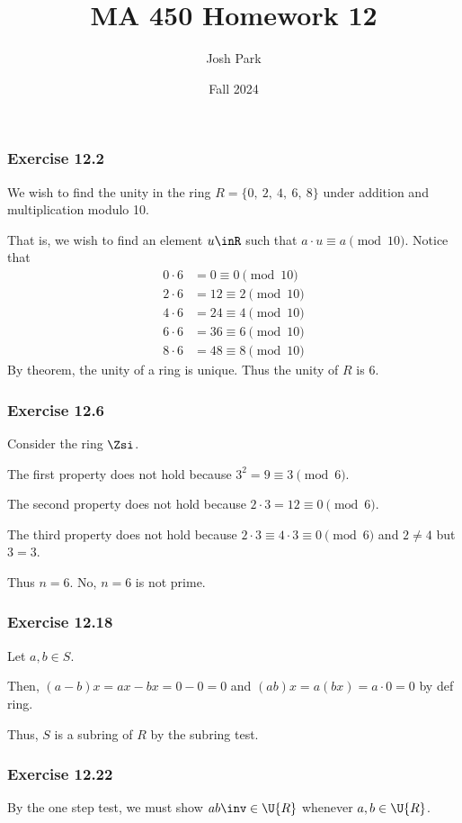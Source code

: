 \documentclass{article}
\author{Josh Park}
\date{\vspace*{-1em}Fall 2024}
\title{\vspace*{-2em}MA 450 Homework 12\vspace*{-1em}}
\begin{document}
\maketitle
\subsubsection*{Exercise 12.2}
We wish to find the unity in the ring \( R = \{0,\ 2,\ 4,\ 6,\ 8\} \) under addition and multiplication modulo 10.

That is, we wish to find an element \( u\inR \) such that \( a\cdot u \equiv a \pmod{10}\). Notice that
\begin{align*}
  0\cdot 6 &= 0 \equiv 0 \pmod{10} \\
  2\cdot 6 &= 12 \equiv 2 \pmod{10} \\
  4\cdot 6 &= 24 \equiv 4 \pmod{10} \\
  6\cdot 6 &= 36 \equiv 6 \pmod{10} \\
  8\cdot 6 &= 48 \equiv 8 \pmod{10}
\end{align*}
By theorem, the unity of a ring is unique. Thus the unity of \( R \) is \( 6 \).

\subsubsection*{Exercise 12.6}
Consider the ring \( \Zsi \).

The first property does not hold because \( 3^2 = 9 \equiv 3 \pmod{6} \).

The second property does not hold because \( 2\cdot 3 = 12 \equiv 0 \pmod{6} \).

The third property does not hold because \( 2\cdot 3 \equiv 4\cdot 3\equiv 0 \pmod{6} \) and \( 2\neq 4 \) but \( 3=3 \).

Thus \( n = 6 \). No, \( n = 6 \) is not prime.

\subsubsection*{Exercise 12.18}
Let \( a,b \in S \).

Then, \( (a-b)x = ax-bx = 0-0 = 0\) and \( (ab)x = a(bx) = a\cdot 0 = 0 \) by def ring.

Thus, \( S \) is a subring of \( R \) by the subring test.


\subsubsection*{Exercise 12.22}
By the one step test, we must show \( ab\inv \in \U{R} \) whenever \( a,b\in \U{R} \).
\end{document}
